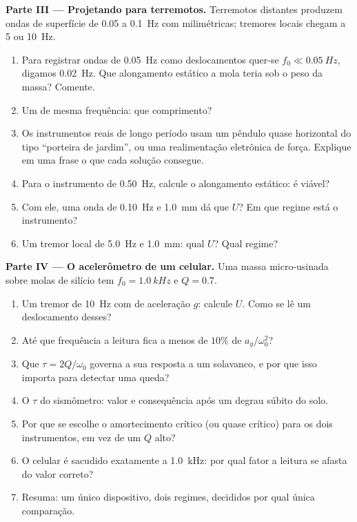 \begin{problem}
\medskip
\noindent\textbf{Parte III --- Projetando para terremotos.}
Terremotos distantes produzem ondas de superfície de \qty{0.05}{} a \qty{0.1}{Hz}
com  milimétricas; tremores locais chegam a \qty{5}{} ou \qty{10}{Hz}.
\begin{enumerate}[resume]
  \item Para registrar ondas de \qty{0.05}{Hz} como deslocamentos quer-se
        $f_0 \ll \qty{0.05}{Hz}$, digamos \qty{0.02}{Hz}. Que alongamento
        estático a mola teria sob o peso da massa? Comente.
  \item Um  de mesma frequência: que comprimento?
  \item Os instrumentos reais de longo período usam um pêndulo quase horizontal
        do tipo ``porteira de jardim'', ou uma realimentação eletrônica de força. Explique
        em uma frase o que cada solução consegue.
  \item Para o instrumento de \qty{0.50}{Hz}, calcule o alongamento estático:
        é viável?
  \item Com ele, uma onda de \qty{0.10}{Hz} e  \qty{1.0}{mm} dá
        que $U$? Em que regime está o instrumento?
  \item Um tremor local de \qty{5.0}{Hz} e  \qty{1.0}{mm}: qual $U$?
        Qual regime?
\end{enumerate}

\medskip
\noindent\textbf{Parte IV --- O acelerômetro de um celular.}
Uma massa micro-usinada sobre molas de silício tem $f_0 = \qty{1.0}{kHz}$ e
$Q = 0.7$.
\begin{enumerate}[resume]
  \item Um tremor de \qty{10}{Hz} com  de aceleração $g$: calcule
        $U$. Como se lê um deslocamento desses?
  \item Até que frequência a leitura fica a menos de $10\%$ de $a_g/\omega_0^2$?
  \item Que  $\tau = 2Q/\omega_0$ governa a sua resposta a um
        solavanco, e por que isso importa para detectar uma queda?
  \item O $\tau$ do sismômetro: valor e consequência após um degrau súbito
        do solo.
  \item Por que se escolhe o amortecimento crítico (ou quase crítico) para os dois
        instrumentos, em vez de um $Q$ alto?
  \item O celular é sacudido exatamente a \qty{1.0}{kHz}: por qual fator
        a leitura se afasta do valor correto?
  \item Resuma: um único dispositivo, dois regimes, decididos por qual única
        comparação.
\end{enumerate}
\end{problem}
